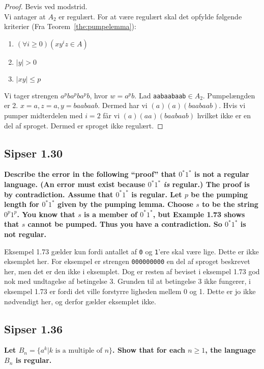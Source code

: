 \begin{proof}
	Bevis ved modstrid.\\
	Vi antager at $A_{2}$ er regulært. For at være regulært skal det opfylde følgende kriterier (Fra Teorem~\ref{the:pumpelemma}):
	\begin{enumerate}
		\item $(\forall i \geq 0)(xy^{i}z \in A)$
		\item $|y| > 0$
		\item $|xy| \leq p$
	\end{enumerate}

	Vi tager strengen $a^{p}ba^{p}ba^{p}b$, hvor $w = a^{p}b$. Lad \texttt{aabaabaab}$\in A_{2}$. Pumpelængden er 2. $x = a, z = a, y = baabaab$. Dermed har vi $(a)(a)(baabaab)$. Hvis vi pumper midterdelen med $i = 2$ får vi $(a)(aa)(baabaab)$ hvilket ikke er en del af sproget. Dermed er sproget ikke regulært.
\end{proof}


\subsection*{Sipser 1.30}%
\label{subsec:sipser1.30}
\textbf{Describe the error in the following ``proof'' that \(0^*1^*\) is not a regular language. (An error must exist because \(0^*1^*\) \emph{is} regular.) The proof is by contradiction. Assume that \(0^*1^*\) is regular. Let \(p\) be the pumping length for \(0^*1^*\) given by the pumping lemma. Choose \(s\) to be the string \(0^p1^p\). You know that \(s\) is a member of \(0^*1^*\), but Example 1.73 shows that \(s\) cannot be pumped. Thus you have a contradiction. So \(0^*1^*\) is not regular.}


Eksempel 1.73 gælder kun fordi antallet af \texttt{0} og \texttt{1}'ere skal være lige. Dette er ikke eksemplet her. For eksempel er strengen \texttt{000000000} en del af sproget beskrevet her, men det er den ikke i eksemplet. Dog er resten af beviset i eksempel 1.73 god nok med undtagelse af betingelse 3. Grunden til at betingelse 3 ikke fungerer, i eksempel 1.73 er fordi det ville forstyrre ligheden mellem 0 og 1. Dette er jo ikke nødvendigt her, og derfor gælder eksemplet ikke.

\subsection*{Sipser 1.36}%
\label{subsec:sipser1.36}

\textbf{Let $B_{n} = \{a^{k} | k \text{ is a multiple of }n\}$. Show that for each $n \ge 1$, the language $B_{n}$ is regular.}

